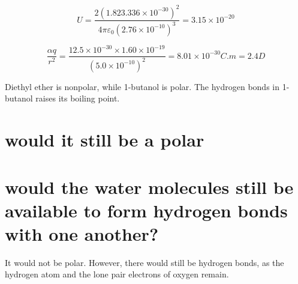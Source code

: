 \documentclass[answers]{exam}
\begin{document}
\begin{questions}

\begin{solution}
	$$U = \frac{2\left(1.823.336\times10^{-30}\right)^2}{4\pi\varepsilon_0\left(2.76\times10^{-10}\right)^3} = 3.15\times10^{-20}$$
\end{solution}


\begin{solution}
	$$\frac{\alpha q}{r^2} = \frac{12.5\times10^{-30}\times1.60\times10^{-19}}{\left(5.0\times10^{-10}\right)^2} = 8.01\times10^{-30}\si{C.m} = 2.4\si{D}$$
\end{solution}


\begin{solution}
	Diethyl ether is nonpolar, while 1-butanol is polar. The hydrogen bonds in 1-butanol raises its boiling point.
\end{solution}


\begin{parts}
	\part{would it still be a polar}
	\part{would the water molecules still be available to form hydrogen bonds with one another?}
\end{parts}

\begin{solution}
	It would not be polar. However, there would still be hydrogen bonds, as the hydrogen atom and the lone pair electrons of oxygen remain.
\end{solution}


\end{questions}
\end{document}
